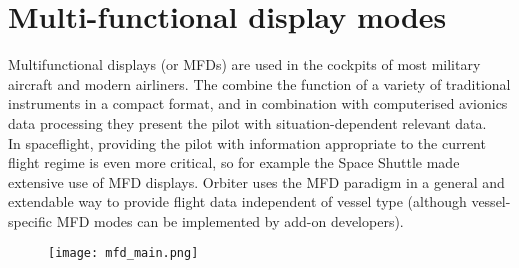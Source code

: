 \documentclass[Orbiter User Manual.tex]{subfiles}
\begin{document}
\section{Multi-functional display modes}
\label{sec:mfd}
Multifunctional displays (or MFDs) are used in the cockpits of most military aircraft and modern airliners. The combine the function of a variety of traditional instruments in a compact format, and in combination with computerised avionics data processing they present the pilot with situation-dependent relevant data.\\
In spaceflight, providing the pilot with information appropriate to the current flight regime is even more critical, so for example the Space Shuttle made extensive use of MFD displays. Orbiter uses the MFD paradigm in a general and extendable way to provide flight data independent of vessel type (although vessel-specific MFD modes can be implemented by add-on developers).

\begin{figure}[H]
  \centering
  \texttt{[image: mfd\_main.png]}
\end{figure}
\end{document}
